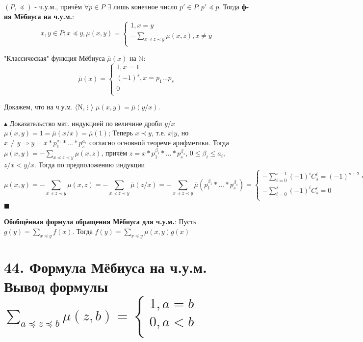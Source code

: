 $(P, \preceq)$ - ч.у.м., причём $\forall p \in P$  $\exists$ лишь конечное число $p' \in P: p' \preceq p$. Тогда \textbf{ф-ия Мёбиуса на ч.у.м.}: \[x, y \in P: x \preceq y, \mu(x, y) = \left\{
  \begin{array}{ccc}
    1, x = y \\
    - \sum_{x \preceq z \prec y} \mu(x, z), x \neq y\\
  \end{array}
\right. \] \par
"Классическая"  функция Мёбиуса $\overline{\mu}(x)$ на $ \mathbb{N}$:
\[ 
\overline{\mu}(x)= \left\{
  \begin{array}{ccc}
    1, x = 1 \\
    (-1)^s, x = p_1\dots p_ s\\
    0 \\
  \end{array}
\right.
\] \par
Докажем, что на ч.у.м. $\langle$N, $\vdots$ $\rangle$ $\mu (x, y) = \overline{\mu}(y/x)$. \par
$\blacktriangle$
Доказательство мат. индукцией по величине дроби $y/x$
$\mu (x, y) = 1 = \overline{\mu}(x/x) = \overline{\mu}(1)$;
Теперь $x \prec y$, т.е. $x|y$, но $x \neq y \Rightarrow y = x*p_1^{a_1}*\dots*p_s^{a_s}$ согласно основной теореме арифметики. Тогда 
$ \mu(x, y) = - \sum_{x \preceq z \prec y} \mu(x, z) $, причём $z = x*p_1^{\beta_1}*\dots*p_s^{\beta_s}$, $0 \leqslant \beta_i \leqslant a_i$, $z/x < y/x$. Тогда по предположению индукции 
\[ \mu(x, y) = - \sum_{x \preceq z \prec y} \mu(x, z) = - \sum_{x \preceq z \prec y} \overline{\mu}(z/x) = - \sum_{x \preceq z \prec y} \overline{\mu}(p_1^{\beta_1}*\dots*p_s^{\beta_s}) = \left\{
  \begin{array}{ccc}
   -\sum_{i=0}^{s-1} (-1)^iC_s^i = (-1)^{s+2} = (-1)^s, a_1=\dots=1 \\
   -\sum_{i=0}^{s} (-1)^iC_s^i = 0\\
  \end{array}
\right.\]
$\blacksquare$ \par
\textbf{Обобщённая формула обращения Мёбиуса для ч.у.м.}: Пусть $g(y) = \sum_{x\preceq y} f(x)$. Тогда $f(y) = \sum_{x\preceq y} \mu(x, y)g(x)$

\section*{44. Формула Мёбиуса на ч.у.м. Вывод формулы $\sum_{a\preceq z \preceq b} \mu(z, b) = \left\{
  \begin{array}{ccc}
   1, a=b \\
   0, a<b \\
  \end{array}
\right.$}

